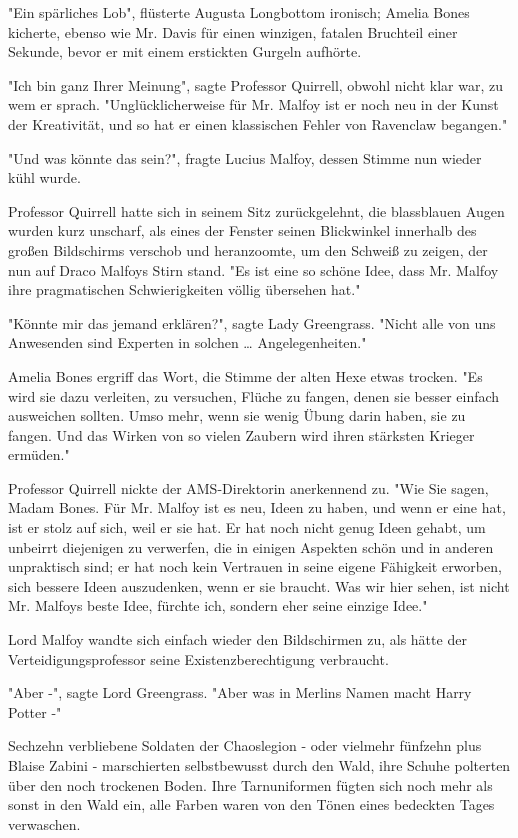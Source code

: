 {"Ein spärliches Lob", flüsterte Augusta Longbottom ironisch; Amelia Bones kicherte, ebenso wie Mr. Davis für einen winzigen, fatalen Bruchteil einer Sekunde, bevor er mit einem erstickten Gurgeln aufhörte.

"Ich bin ganz Ihrer Meinung", sagte Professor Quirrell, obwohl nicht klar war, zu wem er sprach. "Unglücklicherweise für Mr. Malfoy ist er noch neu in der Kunst der Kreativität, und so hat er einen klassischen Fehler von Ravenclaw begangen."

"Und was könnte das sein?", fragte Lucius Malfoy, dessen Stimme nun wieder kühl wurde.

Professor Quirrell hatte sich in seinem Sitz zurückgelehnt, die blassblauen Augen wurden kurz unscharf, als eines der Fenster seinen Blickwinkel innerhalb des großen Bildschirms verschob und heranzoomte, um den Schweiß zu zeigen, der nun auf Draco Malfoys Stirn stand. "Es ist eine so schöne Idee, dass Mr. Malfoy ihre pragmatischen Schwierigkeiten völlig übersehen hat."

"Könnte mir das jemand erklären?", sagte Lady Greengrass. "Nicht alle von uns Anwesenden sind Experten in solchen … Angelegenheiten."

Amelia Bones ergriff das Wort, die Stimme der alten Hexe etwas trocken. "Es wird sie dazu verleiten, zu versuchen, Flüche zu fangen, denen sie besser einfach ausweichen sollten. Umso mehr, wenn sie wenig Übung darin haben, sie zu fangen. Und das Wirken von so vielen Zaubern wird ihren stärksten Krieger ermüden."

Professor Quirrell nickte der AMS-Direktorin anerkennend zu. "Wie Sie sagen, Madam Bones. Für Mr. Malfoy ist es neu, Ideen zu haben, und wenn er eine hat, ist er stolz auf sich, weil er sie hat. Er hat noch nicht genug Ideen gehabt, um unbeirrt diejenigen zu verwerfen, die in einigen Aspekten schön und in anderen unpraktisch sind; er hat noch kein Vertrauen in seine eigene Fähigkeit erworben, sich bessere Ideen auszudenken, wenn er sie braucht. Was wir hier sehen, ist nicht Mr. Malfoys beste Idee, fürchte ich, sondern eher seine einzige Idee."

Lord Malfoy wandte sich einfach wieder den Bildschirmen zu, als hätte der Verteidigungsprofessor seine Existenzberechtigung verbraucht.

"Aber -", sagte Lord Greengrass. "Aber was in Merlins Namen macht Harry Potter -"

Sechzehn verbliebene Soldaten der Chaoslegion - oder vielmehr fünfzehn plus Blaise Zabini - marschierten selbstbewusst durch den Wald, ihre Schuhe polterten über den noch trockenen Boden. Ihre Tarnuniformen fügten sich noch mehr als sonst in den Wald ein, alle Farben waren von den Tönen eines bedeckten Tages verwaschen.

}
